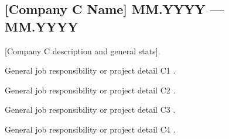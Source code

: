 \subsection{{[Company C Name] \hfill MM.YYYY --- MM.YYYY}}

[Company C description and general stats].

\begin{zitemize}
  \item [General job responsibility or project detail C1].
  \item [General job responsibility or project detail C2].
  \item [General job responsibility or project detail C3].
  \item [General job responsibility or project detail C4].
\end{zitemize}

